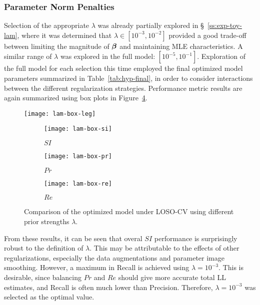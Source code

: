 \subsubsection{Parameter Norm Penalties}\label{sss:exp-lam}
Selection of the appropriate $\lambda$ was already partially explored in \S~\ref{ss:exp-toy-lam},
where it was determined that $\lambda \in [{10}^{-3},{10}^{-2}]$ provided a good trade-off 
between limiting the magnitude of $\bm{\beta}$ and maintaining MLE characteristics.
A similar range of $\lambda$ was explored in the full model: $[{10}^{-5},{10}^{-1}]$.
Exploration of the full model for each selection this time
employed the final optimized model parameters summarized in Table~\ref{tab:hyp-final},
in order to consider interactions between the different regularization strategies.
Performance metric results are again summarized using box plots in Figure~\ref{fig:seg-box-lam}.
\par
\begin{figure}
  \centering
  \texttt{[image: lam-box-leg]}\\[0.5em]
  \begin{subfigure}{0.32\textwidth}
    \centering\texttt{[image: lam-box-si]}
    \caption{$SI$}%
    \label{fig:seg-box-lam-si}
  \end{subfigure}
  \begin{subfigure}{0.32\textwidth}
    \centering\texttt{[image: lam-box-pr]}
    \caption{$Pr$}%
    \label{fig:seg-box-lam-pr}
  \end{subfigure}
  \begin{subfigure}{0.32\textwidth}
    \centering\texttt{[image: lam-box-re]}
    \caption{$Re$}%
    \label{fig:seg-box-lam-re}
  \end{subfigure}
  \caption{Comparison of the optimized model under LOSO-CV
    using different prior strengths $\lambda$.}%
  \label{fig:seg-box-lam}
\end{figure}
From these results, it can be seen that overal $SI$ performance
is surprisingly robust to the definition of $\lambda$.
This may be attributable to the effects of other regularizations,
especially the data augmentations and parameter image smoothing.
However, a maximum in Recall is achieved using $\lambda = 10^{-3}$.
This is desirable, since balancing $Pr$ and $Re$ should give %
more accurate total LL estimates, and Recall is often much lower than Precision.
Therefore, $\lambda = 10^{-3}$ was selected as the optimal value.
